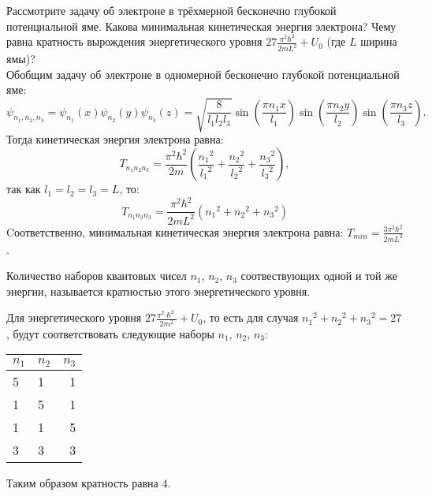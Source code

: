 \documentclass[__main__.tex]{subfiles}
\begin{document}
Рассмотрите задачу об электроне в трёхмерной бесконечно глубокой потенциальной яме. Какова минимальная кинетическая энергия электрона? Чему равна кратность вырождения энергетического уровня $27\frac{\pi^2\hbar^2}{2mL^2}+U_0$ (где $L$ ширина ямы)?\\

Обобщим задачу об электроне в одномерной бесконечно глубокой потенциальной яме:
$$
    \psi_{{n_1},{n_2},{n_3}}
    =
    \psi_{n_1}(x)\psi_{n_2}(y)\psi_{n_3}(z)
    =\sqrt{\frac{8}{l_1 l_2 l_3}}\sin\left(\frac{\pi n_1 x}{l_1}\right)\sin\left(\frac{\pi n_2 y}{l_2}\right)\sin\left(\frac{\pi n_3 z}{l_3}\right).
$$
Тогда кинетическая энергия электрона равна:
$$
    T_{n_1 n_2 n_3}
    =
    \frac{\pi^2\hbar^2}{2m}\left(\frac{{n_1}^2}{{l_1}^2}
    +
    \frac{{n_2}^2}{{l_2}^2} + \frac{{n_3}^2}{{l_3}^2}\right),
$$
так как $l_1=l_2=l_3=L$, то:
$$
    T_{n_1 n_2 n_3}
    =
    \frac{\pi^2\hbar^2}{2m L^2}\left({n_1}^2 + {n_2}^2 + {n_3}^2\right)
$$
Cоответственно, минимальная кинетическая энергия электрона равна: $T_{min}=\frac{3\pi^2\hbar^2}{2m L^2}$.
\begin {definition}
Количество наборов квантовых чисел $n_1$, $n_2$, $n_3$ соотвествующих одной и той же энергии, называется кратностью этого энергетического уровня.
\end {definition}
Для энергетического уровня $27\frac{\pi^2\hslash^2}{2m^2}+U_0$, то есть для случая ${n_1}^2+{n_2}^2+{n_3}^2=27$, будут соответствовать следующие наборы $n_1$, $n_2$, $n_3$:
\begin {table}[h]
\centering
\begin {tabular}{llr}
\toprule
$n_1$ & $n_2$ & $n_3$ \\
\midrule
5 & 1 & 1 \\
1 & 5 & 1 \\
1 & 1 & 5 \\
3 & 3 & 3 \\
\bottomrule
\end {tabular}
\end {table}

Таким образом кратность равна $4$.
\end{document}
